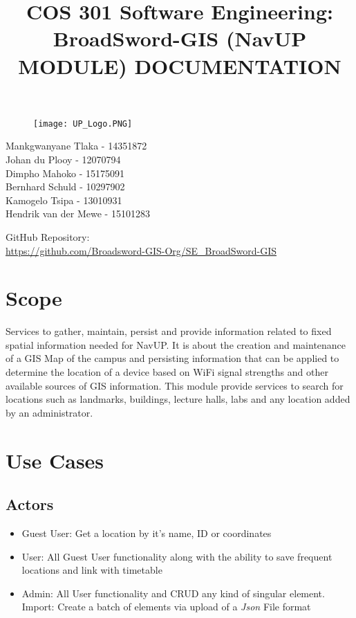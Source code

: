 \documentclass{article}
\begin{document}
		\begin{figure}[t]
			\centering
			\texttt{[image: UP\_Logo.PNG]}
		\end{figure}
	
			\title{COS 301 Software Engineering: BroadSword-GIS (NavUP MODULE) DOCUMENTATION}
\maketitle
				
		\begin{flushright} \large
			Mankgwanyane Tlaka    - 14351872\\
			Johan	     du Plooy -	12070794\\
			Dimpho	     Mahoko   -	15175091\\
			Bernhard	 Schuld	  - 10297902\\
			Kamogelo	 Tsipa	  - 13010931\\
			Hendrik	van  der Mewe - 15101283\\
		\end{flushright}
		
		
		
		
		GitHub Repository: \href{https://github.com/Broadsword-GIS-Org/SE_BroadSword-GIS}\\
		\url{https://github.com/Broadsword-GIS-Org/SE_BroadSword-GIS}
	

\clearpage
\tableofcontents
\clearpage

\section{Scope}
Services to gather, maintain, persist and provide information related to fixed
spatial information needed for NavUP. It is about the creation and maintenance
 of a GIS Map of the campus and persisting information that can be
applied to determine the location of a device based on WiFi signal strengths
and other available sources of GIS information.
This module provide services to search for locations such as landmarks,
buildings, lecture halls, labs and any location added by an administrator.

\section{Use Cases}
	\subsection{Actors}
		\begin{itemize}
			\item Guest User: Get a location by it's name, ID or coordinates
			
			\item User: All Guest User functionality along with the ability to save frequent locations and link with timetable
			
 			\item Admin: All User functionality and CRUD any kind of singular element. 
			Import: Create a batch of elements via upload of a \textit{Json} File format
  			
				
		\end{itemize}
		
\end{document}
